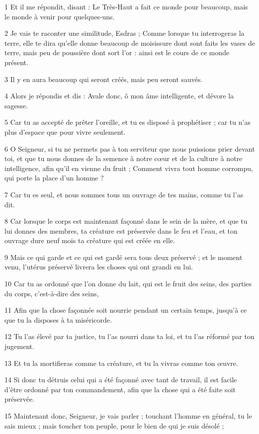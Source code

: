 \par 1 Et il me répondit, disant : Le Très-Haut a fait ce monde pour beaucoup, mais le monde à venir pour quelques-uns.
\par 2 Je vais te raconter une similitude, Esdras ; Comme lorsque tu interrogeras la terre, elle te dira qu'elle donne beaucoup de moisissure dont sont faits les vases de terre, mais peu de poussière dont sort l'or : ainsi est le cours de ce monde présent.
\par 3 Il y en aura beaucoup qui seront créés, mais peu seront sauvés.
\par 4 Alors je répondis et dis : Avale donc, ô mon âme intelligente, et dévore la sagesse.
\par 5 Car tu as accepté de prêter l'oreille, et tu es disposé à prophétiser ; car tu n'as plus d'espace que pour vivre seulement.
\par 6 O Seigneur, si tu ne permets pas à ton serviteur que nous puissions prier devant toi, et que tu nous donnes de la semence à notre cœur et de la culture à notre intelligence, afin qu'il en vienne du fruit ; Comment vivra tout homme corrompu, qui porte la place d’un homme ?
\par 7 Car tu es seul, et nous sommes tous un ouvrage de tes mains, comme tu l'as dit.
\par 8 Car lorsque le corps est maintenant façonné dans le sein de la mère, et que tu lui donnes des membres, ta créature est préservée dans le feu et l'eau, et ton ouvrage dure neuf mois ta créature qui est créée en elle.
\par 9 Mais ce qui garde et ce qui est gardé sera tous deux préservé ; et le moment venu, l'utérus préservé livrera les choses qui ont grandi en lui.
\par 10 Car tu as ordonné que l'on donne du lait, qui est le fruit des seins, des parties du corps, c'est-à-dire des seins,
\par 11 Afin que la chose façonnée soit nourrie pendant un certain temps, jusqu'à ce que tu la disposes à ta miséricorde.
\par 12 Tu l'as élevé par ta justice, tu l'as nourri dans ta loi, et tu l'as réformé par ton jugement.
\par 13 Et tu la mortifieras comme ta créature, et tu la vivras comme ton œuvre.
\par 14 Si donc tu détruis celui qui a été façonné avec tant de travail, il est facile d'être ordonné par ton commandement, afin que la chose qui a été faite soit préservée.
\par 15 Maintenant donc, Seigneur, je vais parler ; touchant l’homme en général, tu le sais mieux ; mais toucher ton peuple, pour le bien de qui je suis désolé ;
